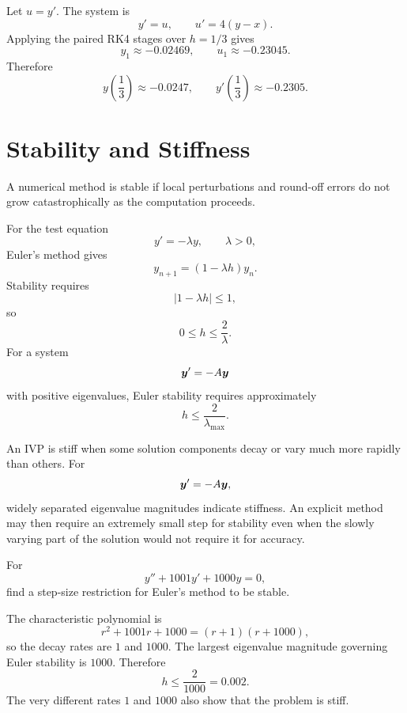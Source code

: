 \begin{solution}[5.0cm]
Let $u=y'$.  The system is
\[
 y'=u,
 \qquad
 u'=4(y-x).
\]
Applying the paired RK4 stages over $h=1/3$ gives
\[
 y_1\approx-0.02469,
 \qquad
 u_1\approx-0.23045.
\]
Therefore
\[
 y\left(\frac13\right)\approx-0.0247,
 \qquad
 y'\left(\frac13\right)\approx-0.2305.
\]
\end{solution}

\section{Stability and Stiffness}

A numerical method is stable if local perturbations and round-off errors do not grow catastrophically as the computation proceeds.

For the test equation
\[
 y'=-\lambda y,
 \qquad \lambda>0,
\]
Euler's method gives
\[
 y_{n+1}=(1-\lambda h)y_n.
\]
Stability requires
\[
 |1-\lambda h|\le1,
\]
so
\[
 0\le h\le\frac2\lambda.
\]
For a system
\[
 \boldsymbol{y}'=-A\boldsymbol{y}
\]
with positive eigenvalues, Euler stability requires approximately
\[
 h\le\frac{2}{\lambda_{\max}}.
\]

An IVP is stiff when some solution components decay or vary much more rapidly than others.  For
\[
 \boldsymbol{y}'=-A\boldsymbol{y},
\]
widely separated eigenvalue magnitudes indicate stiffness.  An explicit method may then require an extremely small step for stability even when the slowly varying part of the solution would not require it for accuracy.

\begin{example}
For
\[
 y''+1001y'+1000y=0,
\]
find a step-size restriction for Euler's method to be stable.
\end{example}

\begin{solution}[3.8cm]
The characteristic polynomial is
\[
 r^2+1001r+1000=(r+1)(r+1000),
\]
so the decay rates are $1$ and $1000$.  The largest eigenvalue magnitude governing Euler stability is $1000$.  Therefore
\[
 h\le\frac2{1000}=0.002.
\]
The very different rates $1$ and $1000$ also show that the problem is stiff.
\end{solution}
